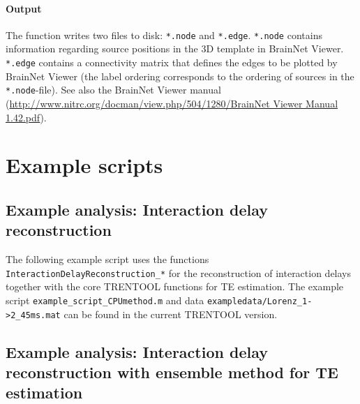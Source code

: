 \documentclass[a4paper,10pt]{article}
\begin{document}
\paragraph*{Output} The function writes two files to disk: \texttt{*.node} and \texttt{*.edge}. \texttt{*.node} contains information regarding source positions in the 3D template in BrainNet Viewer. \texttt{*.edge} contains a connectivity matrix that defines the edges to be plotted by BrainNet Viewer (the label ordering corresponds to the ordering of sources in the \texttt{*.node}-file). See also the BrainNet Viewer manual (\url{http://www.nitrc.org/docman/view.php/504/1280/BrainNet Viewer Manual 1.42.pdf}).





\newpage
\section{Example scripts} \label{sec:example_scripts}

% 
% 


\subsection{Example analysis: Interaction delay reconstruction}

The following example script uses the functions \texttt{InteractionDelayReconstruction\_*} for the reconstruction of interaction delays together with the core TRENTOOL functions for TE estimation. The example script \texttt{example\_script\_CPUmethod.m} and data \texttt{exampledata/Lorenz\_1->2\_45ms.mat} can be found in the current TRENTOOL version.



\subsection{Example analysis: Interaction delay reconstruction with ensemble method for TE estimation}
\end{document}
